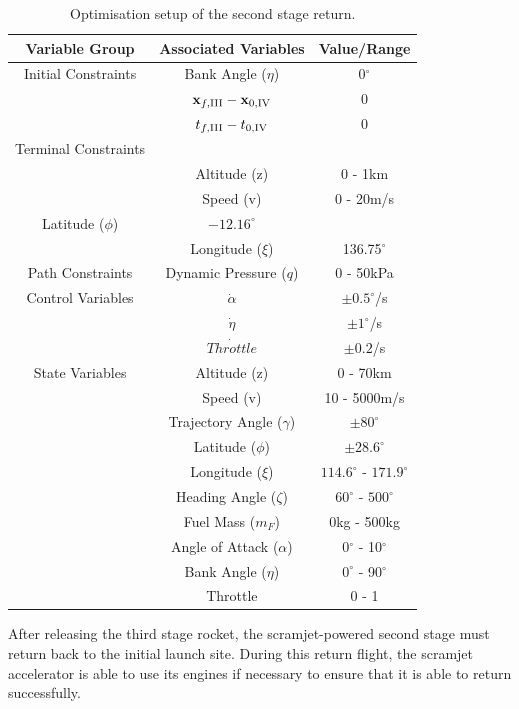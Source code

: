 \begin{table}[ht]
	\centering
	\begin{tabular}{|c|c|c|}
		\hline \textbf{Variable Group}  & \textbf{Associated Variables} & \textbf{Value/Range}\\
		\hline Initial Constraints  & Bank Angle ($\eta$)& 0$^\circ$ \\ 
		& $\textbf{x}_{f,\textrm{\rom{3}}} - \textbf{x}_{0,\textrm{\rom{4}}}$ & 0\\ & $t_{f,\textrm{\rom{3}}} - t_{0,\textrm{\rom{4}}}$ & 0\\
		\hline Terminal Constraints& & \\ & Altitude (z) & 0 - 1km \\ & Speed (v) & 0 - 20m/s \\ Latitude ($\phi$)  & $-12.16^\circ$ \\& Longitude ($\xi$) & 136.75$^\circ$\\
		\hline Path Constraints & Dynamic Pressure ($q$)& 0 - 50kPa\\ 
		\hline Control Variables & $\dot{\alpha}$ &  $\pm0.5^\circ$/s\\  & $\dot{\eta}$ &  $\pm1^\circ$/s\\ & $\dot{Throttle}$& $\pm0.2$/s\\
		\hline State Variables& Altitude (z) & 0 - 70km\\ & Speed (v)& 10 - 5000m/s\\ & Trajectory Angle ($\gamma$)& $\pm80^\circ$\\    & Latitude ($\phi$) &$\pm28.6^\circ$ \\  & Longitude ($\xi$)& $114.6^\circ$ - $171.9^\circ$\\   & Heading Angle ($\zeta$)& $60^\circ$ - $500^\circ$ \\  & Fuel Mass ($m_F$)& 0kg - 500kg\\  & Angle of Attack ($\alpha$)&  0$^\circ$ - 10$^\circ$\\  & Bank Angle ($\eta$)& $0^\circ$ - 90$^\circ$\\  & Throttle & 0 - 1 \\ 
		\hline 
	\end{tabular} 
	\caption{Optimisation setup of the second stage return.}
	
\end{table}
\noindent
After releasing the third stage rocket, the scramjet-powered second stage must return back to the initial launch site. During this return flight, the scramjet accelerator is able to use its engines if necessary to ensure that it is able to return successfully. 
